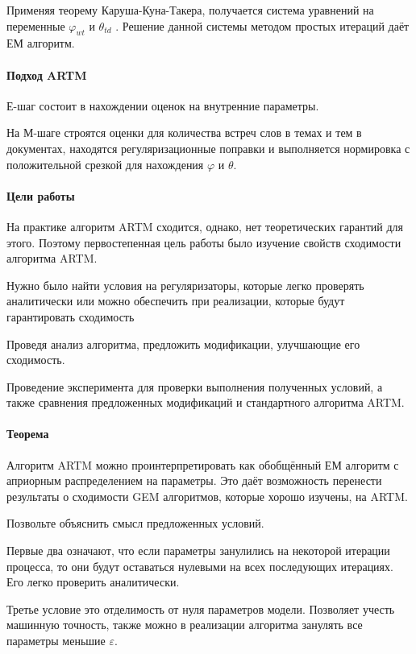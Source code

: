 \documentclass[12pt]{article}
\renewcommand{\phi}{\varphi}
\begin{document}
Применяя теорему Каруша-Куна-Такера, получается система уравнений на переменные  $\phi_{wt}$ и $\theta_{td}$ . Решение данной системы методом простых итераций даёт ЕМ алгоритм.

\paragraph{Подход ARTM}

Е-шаг состоит в нахождении оценок на внутренние параметры.

На М-шаге строятся оценки для количества встреч слов в темах и тем в документах, находятся регуляризационные поправки и выполняется нормировка с положительной срезкой для нахождения $\phi$  и $\theta$.

\paragraph{Цели работы}
На практике алгоритм ARTM сходится, однако, нет теоретических гарантий для этого. Поэтому первостепенная цель работы было изучение свойств сходимости алгоритма ARTM.

Нужно было найти условия на регуляризаторы, которые легко проверять аналитически или можно обеспечить при реализации, которые будут гарантировать сходимость

Проведя анализ алгоритма, предложить модификации, улучшающие его сходимость.

Проведение эксперимента для проверки выполнения полученных условий, а также сравнения предложенных модификаций и стандартного алгоритма ARTM.

\paragraph{Теорема}
Алгоритм ARTM можно проинтерпретировать как обобщённый ЕМ алгоритм с априорным распределением на параметры. Это даёт возможность перенести результаты о сходимости GEM алгоритмов, которые хорошо изучены, на ARTM.

Позвольте объяснить смысл предложенных условий.

Первые два означают, что если параметры занулились на некоторой итерации процесса, то они будут оставаться нулевыми на всех последующих итерациях. Его легко проверить аналитически.

Третье условие это отделимость от нуля параметров модели. Позволяет учесть машинную точность, также можно в реализации алгоритма занулять все параметры меньшие $\varepsilon$. 
\end{document}
